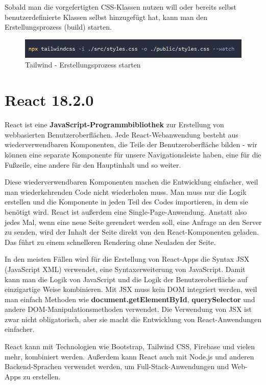 Sobald man die vorgefertigten CSS-Klassen nutzen will oder bereits selbst 
benutzerdefinierte Klassen selbst hinzugefügt hat, kann man den Erstellungsprozess (build) starten.
\begin{figure}[ht!]
  \centering
  \includegraphics[scale=1]{pics/build-tailwind.PNG}
  \caption{\label{fig:Tailwind}Tailwind - Erstellungsprozess starten }
\end{figure}



\section{React 18.2.0}
React ist eine \textbf{JavaScript-Programmbibliothek} zur Erstellung von webbasierten Benutzeroberflächen. 
Jede React-Webanwendung besteht aus wiederverwendbaren Komponenten, die Teile der Benutzeroberfläche bilden - wir können 
eine separate Komponente für unsere Navigationsleiste haben, eine für die Fußzeile, eine andere für den Hauptinhalt und so weiter. 

Diese wiederverwendbaren Komponenten machen die Entwicklung einfacher, weil man wiederkehrenden Code nicht wiederholen muss. 
Man muss nur die Logik erstellen und die Komponente in jeden Teil des Codes importieren, in dem sie benötigt wird.
React ist außerdem eine Single-Page-Anwendung. Anstatt also jedes Mal, wenn eine neue Seite gerendert werden soll, eine Anfrage 
an den Server zu senden, wird der Inhalt der Seite direkt von den React-Komponenten geladen. Das führt zu einem schnelleren 
Rendering ohne Neuladen der Seite.

In den meisten Fällen wird für die Erstellung von React-Apps die Syntax JSX (JavaScript XML) verwendet, eine Syntaxerweiterung 
von JavaScript. Damit kann man die Logik von JavaScript und die Logik der Benutzeroberfläche auf einzigartige Weise kombinieren. 
Mit JSX muss kein DOM integriert werden, weil man einfach Methoden wie \textbf{document.getElementById}, \textbf{querySelector} 
und andere DOM-Manipulationsmethoden verwendet.
Die Verwendung von JSX ist zwar nicht obligatorisch, aber sie macht die Entwicklung von React-Anwendungen einfacher.

React kann mit Technologien wie Bootstrap, Tailwind CSS, Firebase und vielen mehr, kombiniert werden. 
Außerdem kann React auch mit Node.js und anderen Backend-Sprachen verwendet werden, um Full-Stack-Anwendungen und Web-Apps zu
erstellen. 

